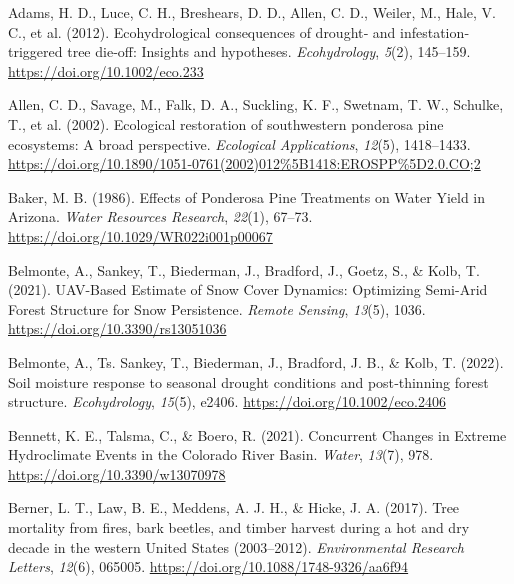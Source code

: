 \documentclass[
]{agujournal2019}
\newlength{\cslhangindent}
\newenvironment{CSLReferences}[2] %
 {\begin{list}{}{%
  \setlength{\itemindent}{0pt}
  \setlength{\leftmargin}{0pt}
  \setlength{\parsep}{0pt}
  \ifodd #1
   \setlength{\leftmargin}{\cslhangindent}
   \setlength{\itemindent}{-1\cslhangindent}
  \fi
  \setlength{\itemsep}{#2\baselineskip}}}
 {\end{list}}
\begin{document}
\label{refs}
\begin{CSLReferences}{1}{0}
Adams, H. D., Luce, C. H., Breshears, D. D., Allen, C. D., Weiler, M.,
Hale, V. C., et al. (2012). Ecohydrological consequences of drought‐ and
infestation‐ triggered tree die‐off: Insights and hypotheses.
\emph{Ecohydrology}, \emph{5}(2), 145--159.
\url{https://doi.org/10.1002/eco.233}

Allen, C. D., Savage, M., Falk, D. A., Suckling, K. F., Swetnam, T. W.,
Schulke, T., et al. (2002). Ecological restoration of southwestern
ponderosa pine ecosystems: A broad perspective. \emph{Ecological
Applications}, \emph{12}(5), 1418--1433.
\url{https://doi.org/10.1890/1051-0761(2002)012\%5B1418:EROSPP\%5D2.0.CO;2}

Baker, M. B. (1986). Effects of {Ponderosa} {Pine} {Treatments} on
{Water} {Yield} in {Arizona}. \emph{Water Resources Research},
\emph{22}(1), 67--73. \url{https://doi.org/10.1029/WR022i001p00067}

Belmonte, A., Sankey, T., Biederman, J., Bradford, J., Goetz, S., \&
Kolb, T. (2021). {UAV}-{Based} {Estimate} of {Snow} {Cover} {Dynamics}:
{Optimizing} {Semi}-{Arid} {Forest} {Structure} for {Snow}
{Persistence}. \emph{Remote Sensing}, \emph{13}(5), 1036.
\url{https://doi.org/10.3390/rs13051036}

Belmonte, A., Ts. Sankey, T., Biederman, J., Bradford, J. B., \& Kolb,
T. (2022). Soil moisture response to seasonal drought conditions and
post‐thinning forest structure. \emph{Ecohydrology}, \emph{15}(5),
e2406. \url{https://doi.org/10.1002/eco.2406}

Bennett, K. E., Talsma, C., \& Boero, R. (2021). Concurrent {Changes} in
{Extreme} {Hydroclimate} {Events} in the {Colorado} {River} {Basin}.
\emph{Water}, \emph{13}(7), 978. \url{https://doi.org/10.3390/w13070978}

Berner, L. T., Law, B. E., Meddens, A. J. H., \& Hicke, J. A. (2017).
Tree mortality from fires, bark beetles, and timber harvest during a hot
and dry decade in the western {United} {States} (2003--2012).
\emph{Environmental Research Letters}, \emph{12}(6), 065005.
\url{https://doi.org/10.1088/1748-9326/aa6f94}


\end{CSLReferences}
\end{document}
